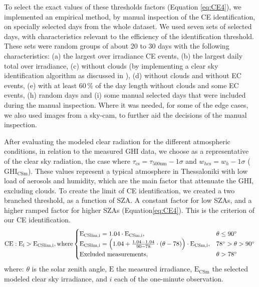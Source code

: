 \documentclass[preprint, 3p,
authoryear]{elsarticle} %
\begin{document}
To select the exact values of these thresholds factors (Equation
\ref{eq:CE4}), we implemented an empirical method, by manual inspection
of the CE identification, on specially selected days from the whole
dataset. We used seven sets of selected days, with characteristics
relevant to the efficiency of the identification threshold. These sets
were random groups of about 20 to 30 days with the following
characteristics: (a) the largest over irradiance CE events, (b) the
largest daily total over irradiance, (c) without clouds (by implementing
a clear sky identification algorithm as discussed in
\citet{Natsis2023}), (d) without clouds and without EC events, (e) with
at least \(60\,\%\) of the day length without clouds and some EC events,
(h) random days and (i) some manual selected days that were included
during the manual inspection. Where it was needed, for some of the edge
cases, we also used images from a sky-cam, to further aid the decisions
of the manual inspection.

After evaluating the modeled clear radiation for the different
atmospheric conditions, in relation to the measured GHI data, we choose
as a representative of the clear sky radiation, the case where
\(\tau_{\text{cs}} = \tau_{500\text{nm}} - 1\sigma\) and
\(w_{h\text{cs}} = w_h - 1\sigma\) (\(\text{GHI}_\text{CSm}\)). These
values represent a typical atmosphere in Thessaloniki with low load of
aerosols and humidity, which are the main factor that attenuate the GHI,
excluding clouds. To create the limit of CE identification, we created a
two branched threshold, as a function of SZA. A constant factor for low
SZAs, and a higher ramped factor for higher SZAs
(Equation\nobreakspace\ref{eq:CE4}). This is the criterion of our CE
identification. \begin{equation}
\text{CE} : \text{E}_\text{i} > \text{E}_\text{CSlim,i}, \text{where} \begin{cases}
 \text{E}_\text{CSlim,i} = 1.04 \cdot \text{E}_\text{CSm,i}, & \text{$\theta \leq 90^\circ$}\\
\text{E}_\text{CSlim,i} = \left ({ 1.04 + \frac{1.04 - 1.04}{90 - 78} \cdot (\theta- 78) } \right ) \cdot \text{E}_\text{CSm,i}, & \text{$ 78^\circ > \theta > 90^\circ$}\\
\text{Excluded measurements}, & \theta > 78^\circ
\end{cases}\label{eq:CE4}
\end{equation} where: \(\theta\) is the solar zenith angle, \(\text{E}\)
the measured irradiance, \(\text{E}_\text{CSm}\) the selected modeled
clear sky irradiance, and \(i\) each of the one-minute observation.
\end{document}
